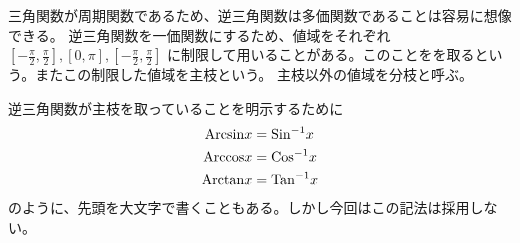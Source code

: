 \documentclass[a4j,dvipdfmx]{jsarticle}
\begin{document}
                三角関数が周期関数であるため、逆三角関数は多価関数であることは容易に想像できる。
                逆三角関数を一価関数にするため、値域をそれぞれ$[-\frac{\pi}{2},\frac{\pi}{2}],[0,\pi],[-\frac{\pi}{2},\frac{\pi}{2}]$
                に制限して用いることがある。このことをを取るという。またこの制限した値域を主枝という。
                主枝以外の値域を分枝と呼ぶ。

                逆三角関数が主枝を取っていることを明示するために
                \begin{align}
                    {\rm Arcsin} x &= {\rm Sin^{-1}} x \\
                    {\rm Arccos} x &= {\rm Cos^{-1}} x \\
                    {\rm Arctan} x &= {\rm Tan^{-1}} x
                \end{align}
                のように、先頭を大文字で書くこともある。しかし今回はこの記法は採用しない。
\end{document}
